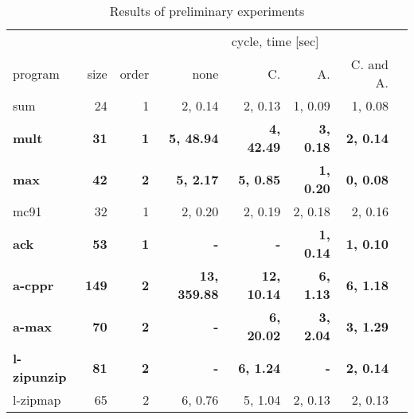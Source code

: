 \begin{table}
\caption{Results of preliminary experiments}
\label{tbl:exp}
\begin{center}
\begin{tabular}{|l|r|r|r|r|r|r|r|}
\hline
            &       &    & \multicolumn{4}{|c|}{cycle, time [sec]} \\
\cline{4-7}
program    & size & order & none &     C. &   A. &    C. and A. \\
\hline
 sum        &    24&      1& 2, 0.14 & 2, 0.13 & 1, 0.09 & 1, 0.08 \\
\bf  mult       &\bf     31&\bf       1&\bf  5, 48.94 &\bf  4, 42.49 &\bf  3, 0.18 &\bf  2, 0.14 \\
\bf  max        &\bf     42&\bf       2&\bf  5, 2.17 &\bf  5, 0.85 &\bf  1, 0.20 &\bf  0, 0.08 \\
 mc91       &    32&      1& 2, 0.20 & 2, 0.19 & 2, 0.18 & 2, 0.16 \\
\bf  ack        &\bf     53&\bf       1&\bf  - &\bf  - &\bf  1, 0.14 &\bf  1, 0.10 \\
\bf  a-cppr     & \bf   149&\bf       2&\bf  13, 359.88 &\bf  12, 10.14 &\bf  6, 1.13 &\bf  6, 1.18 \\
\bf  a-max      &\bf     70&\bf       2&\bf  - &\bf  6, 20.02 &\bf  3, 2.04 &\bf  3, 1.29 \\
\bf l-zipunzip &\bf     81&\bf       2&\bf  - &\bf  6, 1.24 &\bf  - &\bf  2, 0.14 \\
 l-zipmap   &    65&      2& 6, 0.76 & 5, 1.04 & 2, 0.13 & 2, 0.13 \\

\end{tabular}
\end{center}
\end{table}
